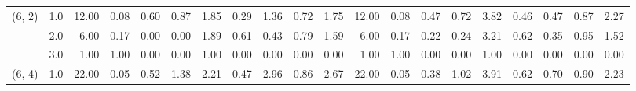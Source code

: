 \begin{tabular}{llrrrrrrrrrrrrrrrrrr}
(6, 2) & 1.0 &              12.00 &                     0.08 &                                 0.60 &                             0.87 &                           1.85 &                                               0.29 &                                            1.36 &                                            0.72 &                                        1.75 &              12.00 &                     0.08 &                                 0.47 &                             0.72 &                           3.82 &                                               0.46 &                                            0.47 &                                            0.87 &                                        2.27 \\
       & 2.0 &               6.00 &                     0.17 &                                 0.00 &                             0.00 &                           1.89 &                                               0.61 &                                            0.43 &                                            0.79 &                                        1.59 &               6.00 &                     0.17 &                                 0.22 &                             0.24 &                           3.21 &                                               0.62 &                                            0.35 &                                            0.95 &                                        1.52 \\
       & 3.0 &               1.00 &                     1.00 &                                 0.00 &                             0.00 &                           1.00 &                                               0.00 &                                            0.00 &                                            0.00 &                                        0.00 &               1.00 &                     1.00 &                                 0.00 &                             0.00 &                           1.00 &                                               0.00 &                                            0.00 &                                            0.00 &                                        0.00 \\
(6, 4) & 1.0 &              22.00 &                     0.05 &                                 0.52 &                             1.38 &                           2.21 &                                               0.47 &                                            2.96 &                                            0.86 &                                        2.67 &              22.00 &                     0.05 &                                 0.38 &                             1.02 &                           3.91 &                                               0.62 &                                            0.70 &                                            0.90 &                                        2.23 \\

\end{tabular}
